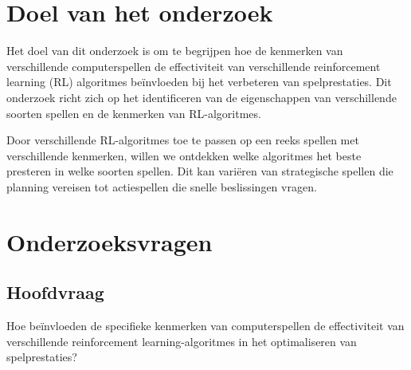 \documentclass[a4paper,12pt]{report}
\begin{document}
\section{Doel van het onderzoek}
Het doel van dit onderzoek is om te begrijpen hoe de kenmerken van
verschillende computerspellen de effectiviteit van verschillende reinforcement
learning (RL) algoritmes beïnvloeden bij het verbeteren van spelprestaties. Dit
onderzoek richt zich op het identificeren van de eigenschappen van
verschillende soorten spellen en de kenmerken van RL-algoritmes.

Door verschillende RL-algoritmes toe te passen op een reeks spellen met
verschillende kenmerken, willen we ontdekken welke algoritmes het beste
presteren in welke soorten spellen. Dit kan variëren van strategische spellen
die planning vereisen tot actiespellen die snelle beslissingen vragen.
\section{Onderzoeksvragen}
\subsection*{Hoofdvraag}
Hoe beïnvloeden de specifieke kenmerken van computerspellen de effectiviteit
van verschillende reinforcement learning-algoritmes in het optimaliseren van
spelprestaties?
\end{document}
